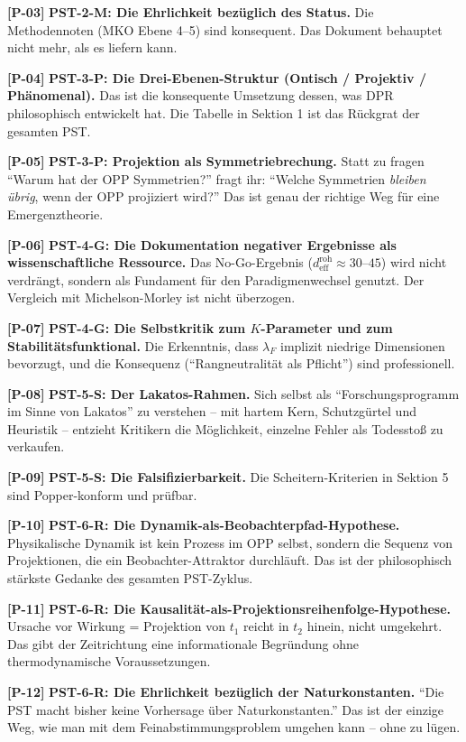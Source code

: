 \documentclass[11pt,a4paper]{article}
\newcommand{\Pos}[1]{\textbf{[P-#1]}}
\begin{document}
\Pos{03} \textbf{PST-2-M: Die Ehrlichkeit bez\"{u}glich des Status.}
Die Methodennoten (MKO Ebene 4--5) sind konsequent. Das Dokument
behauptet nicht mehr, als es liefern kann.

\Pos{04} \textbf{PST-3-P: Die Drei-Ebenen-Struktur (Ontisch /
Projektiv / Ph\"{a}nomenal).} Das ist die konsequente Umsetzung dessen,
was DPR philosophisch entwickelt hat. Die Tabelle in Sektion 1 ist
das R\"{u}ckgrat der gesamten PST.

\Pos{05} \textbf{PST-3-P: Projektion als Symmetriebrechung.} Statt zu
fragen ``Warum hat der OPP Symmetrien?'' fragt ihr: ``Welche
Symmetrien \emph{bleiben \"{u}brig}, wenn der OPP projiziert wird?''
Das ist genau der richtige Weg f\"{u}r eine Emergenztheorie.

\Pos{06} \textbf{PST-4-G: Die Dokumentation negativer Ergebnisse als
wissenschaftliche Ressource.} Das No-Go-Ergebnis ($d_{\text{eff}}^{\text{roh}}
\approx 30$--$45$) wird nicht verdr\"{a}ngt, sondern als Fundament
f\"{u}r den Paradigmenwechsel genutzt. Der Vergleich mit Michelson-Morley
ist nicht \"{u}berzogen.

\Pos{07} \textbf{PST-4-G: Die Selbstkritik zum $K$-Parameter und zum
Stabilit\"{a}tsfunktional.} Die Erkenntnis, dass $\lambda_F$ implizit
niedrige Dimensionen bevorzugt, und die Konsequenz
(``Rangneutralit\"{a}t als Pflicht'') sind professionell.

\Pos{08} \textbf{PST-5-S: Der Lakatos-Rahmen.} Sich selbst als
``Forschungsprogramm im Sinne von Lakatos'' zu verstehen -- mit
hartem Kern, Schutzg\"{u}rtel und Heuristik -- entzieht Kritikern die
M\"{o}glichkeit, einzelne Fehler als Todessto\ss{} zu verkaufen.

\Pos{09} \textbf{PST-5-S: Die Falsifizierbarkeit.} Die
Scheitern-Kriterien in Sektion 5 sind Popper-konform und pr\"{u}fbar.

\Pos{10} \textbf{PST-6-R: Die Dynamik-als-Beobachterpfad-Hypothese.}
Physikalische Dynamik ist kein Prozess im OPP selbst, sondern die
Sequenz von Projektionen, die ein Beobachter-Attraktor durchl\"{a}uft.
Das ist der philosophisch st\"{a}rkste Gedanke des gesamten PST-Zyklus.

\Pos{11} \textbf{PST-6-R: Die Kausalit\"{a}t-als-Projektionsreihenfolge-Hypothese.}
Ursache vor Wirkung = Projektion von $t_1$ reicht in $t_2$ hinein,
nicht umgekehrt. Das gibt der Zeitrichtung eine informationale
Begr\"{u}ndung ohne thermodynamische Voraussetzungen.

\Pos{12} \textbf{PST-6-R: Die Ehrlichkeit bez\"{u}glich der
Naturkonstanten.} ``Die PST macht bisher keine Vorhersage \"{u}ber
Naturkonstanten.'' Das ist der einzige Weg, wie man mit dem
Feinabstimmungsproblem umgehen kann -- ohne zu l\"{u}gen.
\end{document}
